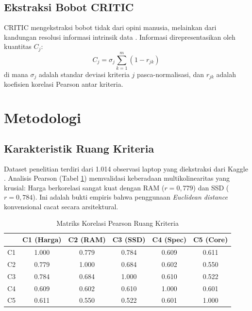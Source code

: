 \documentclass[10pt, a4paper, twocolumn]{article}
\begin{document}
\subsection{Ekstraksi Bobot CRITIC}

CRITIC mengekstraksi bobot tidak dari opini manusia, melainkan dari kandungan resolusi informasi intrinsik data \cite{critic1995}. Informasi direpresentasikan oleh kuantitas $C_j$:
\begin{equation}
C_j = \sigma_j \sum_{k=1}^{m} (1 - r_{jk})
\end{equation}
di mana $\sigma_j$ adalah standar deviasi kriteria $j$ pasca-normalisasi, dan $r_{jk}$ adalah koefisien korelasi Pearson antar kriteria.

\section{Metodologi}

\subsection{Karakteristik Ruang Kriteria}

Dataset penelitian terdiri dari 1.014 observasi laptop yang diekstraksi dari Kaggle \cite{kaggle2023}. Analisis Pearson (Tabel \ref{tab:korelasi}) memvalidasi keberadaan multikolinearitas yang krusial: Harga berkorelasi sangat kuat dengan RAM ($r=0{,}779$) dan SSD ($r=0{,}784$). Ini adalah bukti empiris bahwa penggunaan \textit{Euclidean distance} konvensional cacat secara arsitektural.

\begin{table}[H]
\centering
\caption{Matriks Korelasi Pearson Ruang Kriteria}
\label{tab:korelasi}
\small
\setlength{\tabcolsep}{4pt}
\begin{tabular}{lccccc}
\toprule
 & \textbf{C1 (Harga)} & \textbf{C2 (RAM)} & \textbf{C3 (SSD)} & \textbf{C4 (Spec)} & \textbf{C5 (Core)} \\
\midrule
C1 & 1.000 & 0.779 & 0.784 & 0.609 & 0.611 \\
C2 & 0.779 & 1.000 & 0.684 & 0.602 & 0.550 \\
C3 & 0.784 & 0.684 & 1.000 & 0.610 & 0.522 \\
C4 & 0.609 & 0.602 & 0.610 & 1.000 & 0.601 \\
C5 & 0.611 & 0.550 & 0.522 & 0.601 & 1.000 \\
\bottomrule
\end{tabular}
\end{table}
\end{document}
